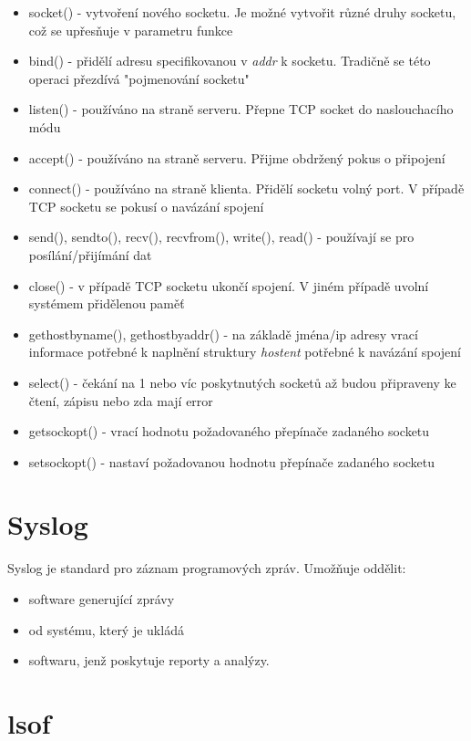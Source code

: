 \documentclass[a4paper]{article}
\begin{document}
	\begin{itemize}
	\item socket() - vytvoření nového socketu. Je možné vytvořit různé druhy socketu, což se upřesňuje v parametru funkce
	\item bind() - přidělí adresu specifikovanou v \emph{addr} k socketu. Tradičně se této operaci přezdívá "pojmenování socketu"
	\item listen() - používáno na straně serveru. Přepne TCP socket do naslouchacího módu
	\item accept() - používáno na straně serveru. Přijme obdržený pokus o připojení
	\item connect() - používáno na straně klienta. Přidělí socketu volný port. V případě TCP socketu se pokusí o navázání spojení
	\item send(), sendto(), recv(), recvfrom(), write(), read() - používají se pro posílání/přijímání dat
	\item close() - v případě TCP socketu ukončí spojení. V jiném případě uvolní systémem přidělenou paměť
	\item gethostbyname(), gethostbyaddr() - na základě jména/ip adresy vrací informace potřebné k naplnění struktury \emph{hostent} potřebné k navázání spojení
	\item select() - čekání na 1 nebo víc poskytnutých socketů až budou připraveny ke čtení, zápisu nebo zda mají error
	\item getsockopt() - vrací hodnotu požadovaného přepínače zadaného socketu
	\item setsockopt() - nastaví požadovanou hodnotu přepínače zadaného socketu
	\end{itemize}

	\section{Syslog}

	Syslog je standard pro záznam programových zpráv. Umožňuje oddělit:
	\begin{itemize}
	\item software generující zprávy
	\item od systému, který je ukládá
	\item softwaru, jenž poskytuje reporty a analýzy.
	\end{itemize}

	\section{lsof}
\end{document}
